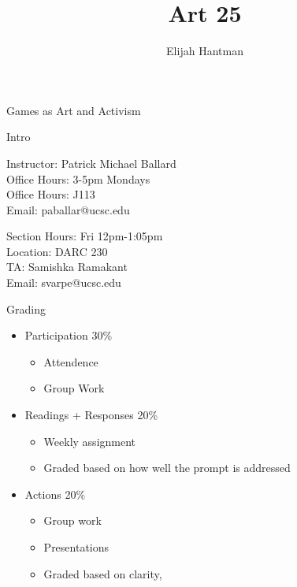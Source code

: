 \documentclass{report}
\title{\Huge{Art 25}}
\author{\huge{Elijah Hantman}}
\date{}
\begin{document}
\maketitle
\newpage

{\huge Games as Art and Activism}

\begin{description}
    \item Intro
        \begin{mdframed}
            Instructor: Patrick Michael Ballard\\
            Office Hours: 3-5pm Mondays\\
            Office Hours: J113\\
            Email: paballar@ucsc.edu
        \end{mdframed}
        \begin{mdframed}
            Section Hours: Fri 12pm-1:05pm\\
            Location: DARC 230\\
            TA: Samishka Ramakant\\
            Email: svarpe@ucsc.edu
        \end{mdframed}
        \begin{mdframed}
            {\large Grading}
            \begin{itemize}
                \item Participation 30\%
                    \begin{itemize}
                        \item Attendence
                        \item Group Work
                    \end{itemize}
                \item Readings + Responses 20\%
                    \begin{itemize}
                        \item Weekly assignment
                        \item Graded based on how well the
                            prompt is addressed
                    \end{itemize}
                \item Actions 20\%
                    \begin{itemize}
                        \item Group work
                        \item Presentations
                        \item Graded based on clarity,

\end{itemize}
\end{itemize}
\end{mdframed}
\end{description}
\end{document}
